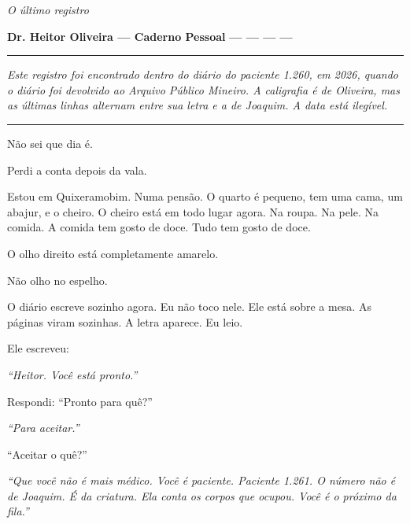 
\noindent \textit{O último registro}

\noindent \textbf{Dr. Heitor Oliveira --- Caderno Pessoal}
\textbf{--- --- --- ---}

\vspace{0.5em}\noindent\rule{\textwidth}{0.5pt}\vspace{0.5em}

\noindent \textit{Este registro foi encontrado dentro do diário do paciente 1.260, em 2026, quando o diário foi devolvido ao Arquivo Público Mineiro. A caligrafia é de Oliveira, mas as últimas linhas alternam entre sua letra e a de Joaquim. A data está ilegível.}

\vspace{0.5em}\noindent\rule{\textwidth}{0.5pt}\vspace{0.5em}

\noindent Não sei que dia é.

\noindent Perdi a conta depois da vala.

\noindent Estou em Quixeramobim. Numa pensão. O quarto é pequeno, tem uma cama, um abajur, e o cheiro. O cheiro está em todo lugar agora. Na roupa. Na pele. Na comida. A comida tem gosto de doce. Tudo tem gosto de doce.

\noindent O olho direito está completamente amarelo.

\noindent Não olho no espelho.

\noindent O diário escreve sozinho agora. Eu não toco nele. Ele está sobre a mesa. As páginas viram sozinhas. A letra aparece. Eu leio.

\noindent Ele escreveu:

\noindent \textit{\textquotedblleft{}Heitor. Você está pronto.\textquotedblright{}}

\noindent Respondi: \textquotedblleft{}Pronto para quê?\textquotedblright{}

\noindent \textit{\textquotedblleft{}Para aceitar.\textquotedblright{}}

\noindent \textquotedblleft{}Aceitar o quê?\textquotedblright{}

\noindent \textit{\textquotedblleft{}Que você não é mais médico. Você é paciente. Paciente 1.261. O número não é de Joaquim. É da criatura. Ela conta os corpos que ocupou. Você é o próximo da fila.\textquotedblright{}}

